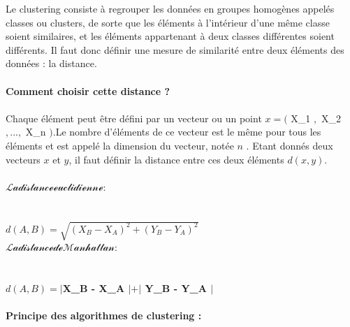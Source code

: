 \documentclass[11pt,twoside,openany,x11names,svgnames]{memoir}
\begin{document}
\begin{itemize}
\begin{itemize}
				Le clustering consiste à regrouper les données en groupes homogènes appelés classes ou clusters, de sorte que les éléments à l’intérieur d’une même classe soient similaires, et les éléments appartenant à deux classes différentes soient différents. Il faut donc définir une mesure de similarité entre deux éléments des données : la distance.\paragraph{}
				\newpage
				\textbf{Comment choisir cette distance ?}\paragraph{}
				Chaque élément peut être défini par un vecteur ou un point $x=($ X_{1} $,$ X_{2} $,...,$ X_{n} $)$.Le nombre d’éléments de ce vecteur est le même pour tous les éléments et est appelé la dimension du vecteur, notée $n$ . 
				Etant donnés deux vecteurs $x$ et $y$, il faut définir la distance entre ces deux éléments $d(x,y)$. \paragraph{}
				\bullet $\mathcal{    La distance euclidienne : }$\paragraph{}\\
				
				\hspace{3cm}\textbf{$d(A,B)=\sqrt{( X_{B} - X_{A} )^2+( Y_{B} - Y_{A} )^2}$} \\
				
				
				\bullet $\mathcal{    La distance de Manhattan : }$\paragraph{} \\
				
				\hspace{3cm}\textbf{$d(A,B)= |  $X_{B} - X_{A} $| + | $ Y_{B} - Y_{A} $ |$} \\
				
				
\paragraph{}
\textbf{Principe des algorithmes de clustering :}\paragraph{}
				

\end{itemize}
\end{itemize}
\end{document}
